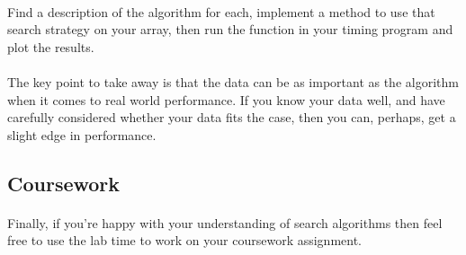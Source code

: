 \documentclass[10pt, a4paper, twosize]{article}
\begin{document}
\paragraph{} Find a description of the algorithm for each, implement a method to use that search strategy on your array, then run the function in your timing program and plot the results.

\paragraph{} The key point to take away is that the data can be as important as the algorithm when it comes to real world performance. If you know your data well, and have carefully considered whether your data fits the case, then you can, perhaps, get a slight edge in performance. 


\subsection{Coursework}

\paragraph{} Finally, if you're happy with your understanding of search algorithms then feel free to use the lab time to work on your coursework assignment.




\end{document}
